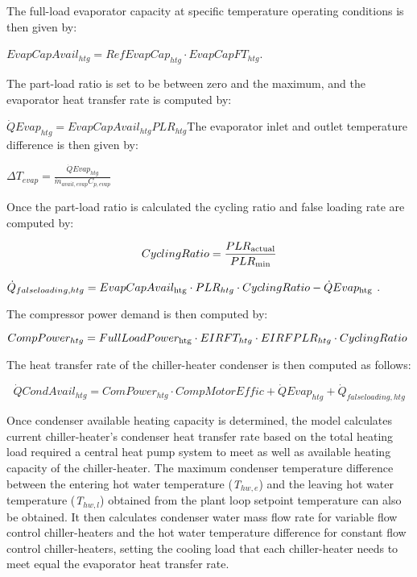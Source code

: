 The full-load evaporator capacity at specific temperature operating conditions is then given by:

\textbf{\emph{\(EvapCapAvai{l_{htg}} = RefEvapCa{p_{htg}} \cdot EvapCapF{T_{htg}}\)}}.

The part-load ratio is set to be between zero and the maximum, and the evaporator heat transfer rate is computed by:

\textbf{\emph{\(\dot QEva{p_{htg}} = EvapCapAvai{l_{htg}}PL{R_{htg}}\)}}The evaporator inlet and outlet temperature difference is then given by:

\textbf{\emph{\(\Delta {T_{evap}} = \frac{{\dot QEva{p_{htg}}}}{{{{\dot m}_{avail,evap}}{C_{p,evap}}}}\)}}

Once the part-load ratio is calculated the cycling ratio and false loading rate are computed by:

\begin{equation}
CyclingRatio = \frac{{PL{R_{{\rm{actual}}}}}}{{PL{R_{{\rm{min}}}}}}
\end{equation}

\({\dot Q_{falseloading,htg}} = EvapCapAvai{l_{{\rm{htg}}}} \cdot PL{R_{htg}} \cdot CyclingRatio - \dot QEva{p_{{\rm{htg}}}}\) .

The compressor power demand is then computed by:

\textbf{\emph{\(CompPowe{r_{htg}} = FullLoadPowe{r_{{\rm{htg}}}} \cdot {\rm{ }}EIRF{T_{htg}}{\rm{ }} \cdot EIRFPL{R_{htg}} \cdot CyclingRatio\)}}

The heat transfer rate of the chiller-heater condenser is then computed as follows:

\begin{equation}
\dot QCondAvai{l_{htg}} = ComPowe{r_{htg}} \cdot CompMotorEffic + \dot QEva{p_{htg}} + {\dot Q_{falseloading,htg}}
\end{equation}

Once condenser available heating capacity is determined, the model calculates current chiller-heater's condenser heat transfer rate based on the total heating load required a central heat pump system to meet as well as available heating capacity of the chiller-heater. The maximum condenser temperature difference between the entering hot water temperature (\emph{T\(_{hw,e}\)}) and the leaving hot water temperature (\emph{T\(_{hw,l}\)}) obtained from the plant loop setpoint temperature can also be obtained. It then calculates condenser water mass flow rate for variable flow control chiller-heaters and the hot water temperature difference for constant flow control chiller-heaters, setting the cooling load that each chiller-heater needs to meet equal the evaporator heat transfer rate.

